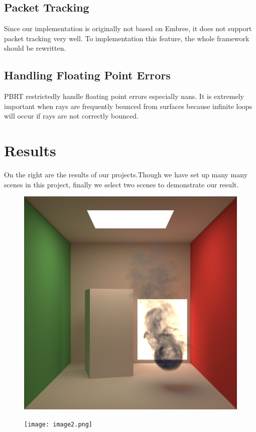 \documentclass[acmtog]{acmart}
\begin{document}
\subsection{Packet Tracking}
Since our implementation is originally not based on Embree, it does not support packet tracking very well.
To implementation this feature, the whole framework should be rewritten.
\subsection{Handling Floating Point Errors}
PBRT restrictedly handle floating point errors especially nans.
It is extremely important when rays are frequently bounced from surfaces
because infinite loops will occur if rays are not correctly bounced.

\section{Results}
On the right are the results of our projects.Though we have set up many many scenes in this project, finally we select two scenes to demonstrate our result.
\begin{figure}[htbp]
	\includegraphics[width=\linewidth]{image1.png}
\end{figure}
\begin{figure}[htbp]
	\texttt{[image: image2.png]}
\end{figure}
\end{document}
